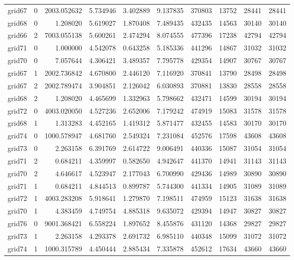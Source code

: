 \begin{longtable}{|l|r|r|r|r|r|r|r|r|r|}
grid67 & 0 & 2003.052632 & 5.734946 & 3.402889 & 9.137835 & 370803 & 13752 & 28441 & 28441 \\
grid68 & 0 & 1.208020 & 5.619027 & 1.870408 & 7.489435 & 432435 & 14563 & 30140 & 30140 \\
grid66 & 2 & 7003.055138 & 5.600261 & 2.474294 & 8.074555 & 477396 & 17238 & 42794 & 42794 \\
grid71 & 0 & 1.000000 & 4.542078 & 0.643258 & 5.185336 & 441296 & 14867 & 31032 & 31032 \\
grid70 & 0 & 7.057644 & 4.306421 & 3.489357 & 7.795778 & 429354 & 14907 & 30767 & 30767 \\
grid67 & 1 & 2002.736842 & 4.670800 & 2.446120 & 7.116920 & 370841 & 13790 & 28498 & 28498 \\
grid67 & 2 & 2002.789474 & 3.904851 & 2.126042 & 6.030893 & 370881 & 13830 & 28558 & 28558 \\
grid68 & 2 & 1.208020 & 4.465699 & 1.332963 & 5.798662 & 432471 & 14599 & 30194 & 30194 \\
grid72 & 0 & 4003.020050 & 4.527236 & 2.652006 & 7.179242 & 474919 & 15083 & 31578 & 31578 \\
grid68 & 1 & 1.313283 & 4.452165 & 1.419312 & 5.871477 & 432455 & 14583 & 30170 & 30170 \\
grid74 & 0 & 1000.578947 & 4.681760 & 2.549324 & 7.231084 & 452576 & 17598 & 43608 & 43608 \\
grid73 & 0 & 2.263158 & 6.391769 & 2.614722 & 9.006491 & 440336 & 15087 & 31054 & 31054 \\
grid71 & 2 & 0.684211 & 4.359997 & 0.582650 & 4.942647 & 441370 & 14941 & 31143 & 31143 \\
grid70 & 2 & 4.646617 & 4.523947 & 2.177043 & 6.700990 & 429436 & 14989 & 30890 & 30890 \\
grid71 & 1 & 0.684211 & 4.844513 & 0.899787 & 5.744300 & 441334 & 14905 & 31089 & 31089 \\
grid72 & 1 & 4003.283208 & 5.918641 & 1.279870 & 7.198511 & 474959 & 15123 & 31638 & 31638 \\
grid70 & 1 & 4.383459 & 4.749754 & 4.885318 & 9.635072 & 429394 & 14947 & 30827 & 30827 \\
grid76 & 0 & 9001.368421 & 6.558224 & 1.897652 & 8.455876 & 431120 & 14368 & 29827 & 29827 \\
grid73 & 1 & 2.263158 & 4.293378 & 2.691732 & 6.985110 & 440348 & 15099 & 31072 & 31072 \\
grid74 & 1 & 1000.315789 & 4.450444 & 2.885434 & 7.335878 & 452612 & 17634 & 43660 & 43660 \\

\end{longtable}

